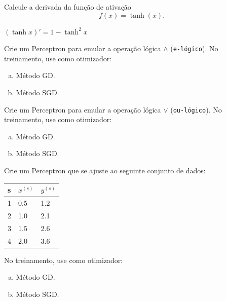 \begin{exer}
  Calcule a derivada da função de ativação
  \begin{equation}
    f(x) = \tanh(x).
  \end{equation}
\end{exer}
\begin{resp}
  $(\tanh x)' = 1 - \tanh^2 x$
\end{resp}

\begin{exer}
  Crie um Perceptron para emular a operação lógica $\land$ (\texttt{e-lógico}). No treinamento, use como otimizador:
  \begin{enumerate}[a)]
  \item Método GD.
  \item Método SGD.
  \end{enumerate}
\end{exer}

\begin{exer}
  Crie um Perceptron para emular a operação lógica $\lor$ (\texttt{ou-lógico}). No treinamento, use como otimizador:
  \begin{enumerate}[a)]
  \item Método GD.
  \item Método SGD.
  \end{enumerate}
\end{exer}

\begin{exer}
  Crie um Perceptron que se ajuste ao seguinte conjunto de dados:
  \begin{center}
    \begin{tabular}{l|ll}
      s & $x^{(s)}$ & $y^{(s)}$\\\hline
      1 & 0.5 & 1.2\\
      2 & 1.0 & 2.1\\
      3 & 1.5 & 2.6\\
      4 & 2.0 & 3.6\\\hline
    \end{tabular}
  \end{center}
  No treinamento, use como otimizador:
  \begin{enumerate}[a)]
  \item Método GD.
  \item Método SGD.
  \end{enumerate}  
\end{exer}
